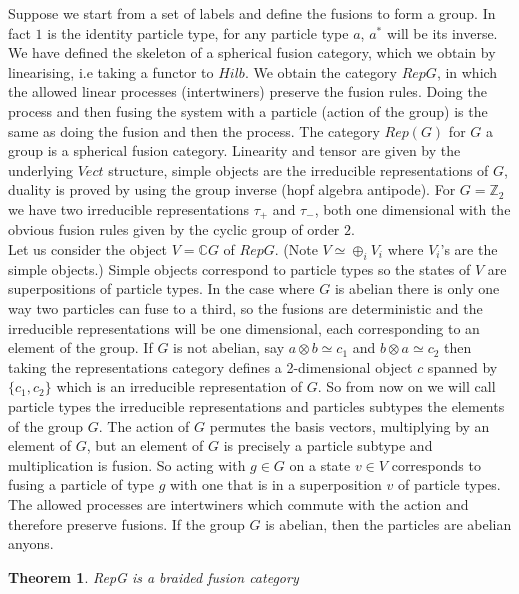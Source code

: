 \documentclass{article}
\newtheorem{theorem}{Theorem}[section]
\newenvironment{example}[1][Example]{\begin{trivlist}
\item[\hskip \labelsep {\bfseries #1}]}{\end{trivlist}}
\begin{document}
\begin{example}
Suppose we start from a set of labels and define the fusions to form a group. In fact $1$ is the identity particle type, for any particle type $a$, $a^*$ will be its inverse. We have defined the skeleton of a spherical fusion category, which we obtain by linearising, i.e taking a functor to $Hilb$. We obtain the category $RepG$, in which the allowed linear processes (intertwiners) preserve the fusion rules. Doing the process and then fusing the system with a particle (action of the group) is the same as doing the fusion and then the process. 
The category $Rep(G)$ for $G$ a group is a spherical fusion category. Linearity and tensor are given by the underlying $Vect$ structure, simple objects are the irreducible representations of $G$, duality is proved by using the group inverse (hopf algebra antipode). For $G=\mathbb{Z}_2$ we have two irreducible representations $\tau_+$ and $\tau_-$, both one dimensional with the obvious fusion rules given by the cyclic group of order $2$.\\
Let us consider the object $V=\mathbb{C}G$ of $RepG$. (Note $V \simeq \oplus_i V_i$ where $V_i$'s are the simple objects.) Simple objects correspond to particle types so the states of $V$ are superpositions of particle types. In the case where $G$ is abelian there is only one way two particles can fuse to a third, so the fusions are deterministic and the irreducible representations will be one dimensional, each corresponding to an element of the group. If $G$ is not abelian, say $a\otimes b \simeq c_1$ and $b \otimes a \simeq c_2$ then taking the representations category defines a 2-dimensional object $c$ spanned by $\{c_1,c_2\}$ which is an irreducible representation of $G$. So from now on we will call particle types the irreducible representations and particles subtypes the elements of the group $G$.  The action of $G$ permutes the basis vectors, multiplying by an element of $G$, but an element of $G$ is precisely a particle subtype and multiplication is fusion. So acting with $g \in G$ on a state $v \in V$ corresponds to fusing a particle of type $g$ with one that is in a superposition $v$ of particle types. The allowed processes are intertwiners which commute with the action and therefore preserve fusions. If the group $G$ is abelian, then the particles are abelian anyons.
\end{example}

\begin{theorem}
RepG is a braided fusion category
\end{theorem}
\end{document}
